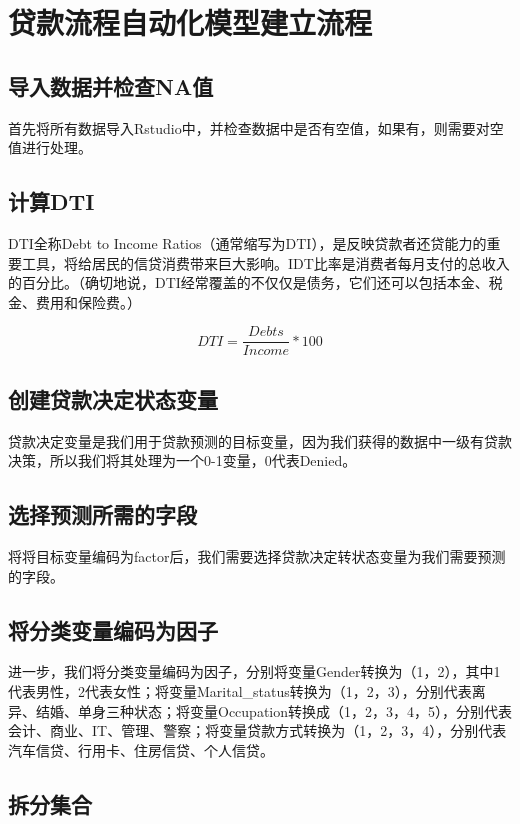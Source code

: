 \documentclass[UTF8]{ctexart}
\begin{document}
\section{贷款流程自动化模型建立流程}
\subsection{导入数据并检查NA值}
首先将所有数据导入Rstudio中，并检查数据中是否有空值，如果有，则需要对空值进行处理。



\subsection{计算DTI}

DTI全称Debt to Income Ratios（通常缩写为DTI），是反映贷款者还贷能力的重要工具，将给居民的信贷消费带来巨大影响。IDT比率是消费者每月支付的总收入的百分比。（确切地说，DTI经常覆盖的不仅仅是债务，它们还可以包括本金、税金、费用和保险费。）

\begin{equation}
	DTI = \frac{Debts}{Income} *100
\end{equation}

\subsection{创建贷款决定状态变量}

贷款决定变量是我们用于贷款预测的目标变量，因为我们获得的数据中一级有贷款决策，所以我们将其处理为一个0-1变量，0代表Denied。

\subsection{选择预测所需的字段}

将将目标变量编码为factor后，我们需要选择贷款决定转状态变量为我们需要预测的字段。

\subsection{将分类变量编码为因子}

进一步，我们将分类变量编码为因子，分别将变量Gender转换为（1，2），其中1代表男性，2代表女性；将变量Marital\_status转换为（1，2，3），分别代表离异、结婚、单身三种状态；将变量Occupation转换成（1，2，3，4，5），分别代表会计、商业、IT、管理、警察；将变量贷款方式转换为（1，2，3，4），分别代表汽车信贷、行用卡、住房信贷、个人信贷。


\subsection{拆分集合}
\end{document}
